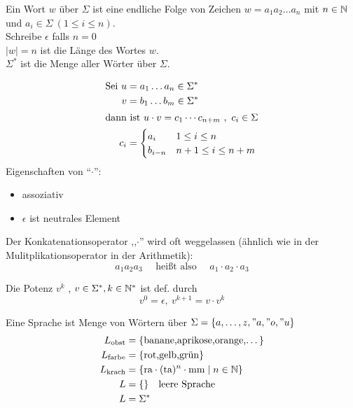 \begin{Def}[name={[Wort $w$ über $\Sigma$]}]\label{def:1.2}
	Ein Wort $w$ über $\Sigma$ ist eine endliche Folge von Zeichen $w=a_1a_2\dots a_n$ mit $n\in\mathbb{N}$ und $a_i\in\Sigma\ (1\leq i\leq n)$.\\
	Schreibe $\epsilon$ falls $n=0$\\
	$|w|=n$ ist die Länge des Wortes $w$.\\
	$\Sigma^*$ ist die Menge aller Wörter über $\Sigma$.
\end{Def}
\begin{Def}
	\begin{align*}
		\text{Sei }u &= a_1\dots a_n\in\Sigma^*\\
		v &= b_1\dots b_m\in\Sigma^*\\
		\shortintertext{dann ist $u\cdot v=c_1\cdots c_{n+m}\ ,\ c_i \in \Sigma$}
		c_i &= \begin{cases}
		a_i & 1\leq i\leq n\\
		b_{i-n} & n+1\leq i\leq n+m
		\end{cases}
	\end{align*}
	Eigenschaften von "`$\cdot$"':
	\begin{itemize}
		\item assoziativ
		\item $\epsilon$ ist neutrales Element
	\end{itemize}
  Der Konkatenationsoperator ,,$\cdot$'' wird oft weggelassen (ähnlich wie in der Mulitplikationsoperator in der Arithmetik):
  \begin{displaymath}
    a_1a_2a_3 \quad \text{ heißt also } \quad a_1\cdot a_2\cdot a_3
  \end{displaymath}
  
	Die Potenz $v^k$ , $v\in \Sigma^*,k\in\mathbb{N}^*$ ist def. durch
	\[ v^0=\epsilon,\ v^{k+1}=v\cdot v^k \]
\end{Def}
%
Eine Sprache ist Menge von Wörtern über $\Sigma=\{a,\dots,z,"a,"o,"u\}$
\begin{align*}
	L_\text{obst} &= \{\text{banane,aprikose,orange,\dots}\}\\
	L_\text{farbe} &= \{\text{rot,gelb,grün}\}\\
	L_\text{krach} &= \{\text{ra}\cdot(\text{ta})^n\cdot\text{mm} \mid n\in\mathbb{N} \}\\
	L &= \{\} \quad\text{leere Sprache}\\
	L &= \Sigma^*
\end{align*}

